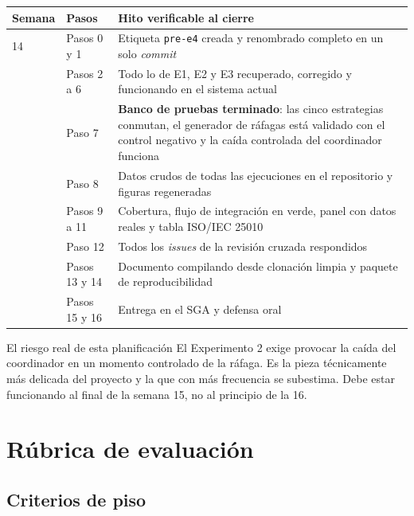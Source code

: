 \documentclass[11pt,a4paper]{article}
\begin{document}
	\begin{center}
		\small
		\begin{tabular}{@{}p{1.6cm}p{5.6cm}p{7.6cm}@{}}
			\toprule
			\textbf{Semana} & \textbf{Pasos} & \textbf{Hito verificable al cierre} \\
			\midrule
			14 & Pasos 0 y 1 & Etiqueta \texttt{pre-e4} creada y renombrado completo en un solo \emph{commit} \\
			\addlinespace
			15 & Pasos 2 a 6 & Todo lo de E1, E2 y E3 recuperado, corregido y funcionando en el sistema actual \\
			\addlinespace
			15 & Paso 7 & \textbf{Banco de pruebas terminado}: las cinco estrategias conmutan, el generador de ráfagas está validado con el control negativo y la caída controlada del coordinador funciona \\
			\addlinespace
			16 & Paso 8 & Datos crudos de todas las ejecuciones en el repositorio y figuras regeneradas \\
			\addlinespace
			16 & Pasos 9 a 11 & Cobertura, flujo de integración en verde, panel con datos reales y tabla ISO/IEC 25010 \\
			\addlinespace
			16 & Paso 12 & Todos los \emph{issues} de la revisión cruzada respondidos \\
			\addlinespace
			17 & Pasos 13 y 14 & Documento compilando desde clonación limpia y paquete de reproducibilidad \\
			\addlinespace
			17 & Pasos 15 y 16 & Entrega en el SGA y defensa oral \\
			\bottomrule
		\end{tabular}
	\end{center}
	
	\begin{avisoBox}{El riesgo real de esta planificación}
		El Experimento 2 exige provocar la caída del coordinador en un momento controlado de la ráfaga. Es la pieza técnicamente más delicada del proyecto y la que con más frecuencia se subestima. Debe estar funcionando al final de la semana 15, no al principio de la 16.
	\end{avisoBox}
	
	\section{Rúbrica de evaluación}
	
	\subsection{Criterios de piso}
	
\end{document}
